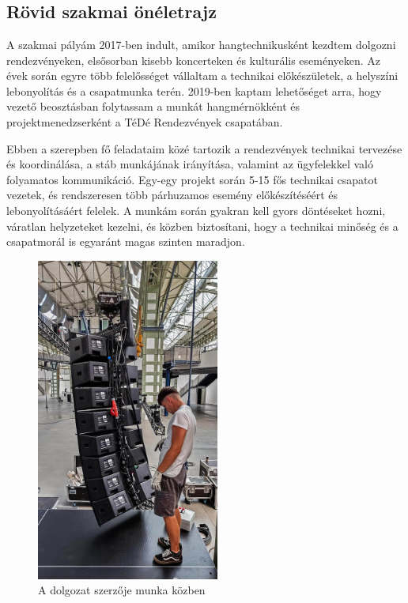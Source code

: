 \chapter{\ManagementExperience}
\section{Rövid szakmai önéletrajz}

A szakmai pályám 2017-ben indult, amikor hangtechnikusként kezdtem dolgozni rendezvényeken, 
elsősorban kisebb koncerteken és kulturális eseményeken. Az évek során egyre több felelősséget vállaltam 
a technikai előkészületek, a helyszíni lebonyolítás és a csapatmunka terén. 2019-ben kaptam lehetőséget arra, 
hogy vezető beosztásban folytassam a munkát hangmérnökként és projektmenedzserként a TéDé Rendezvények csapatában.

Ebben a szerepben fő feladataim közé tartozik a rendezvények technikai tervezése és koordinálása, 
a stáb munkájának irányítása, valamint az ügyfelekkel való folyamatos kommunikáció. 
Egy-egy projekt során 5-15 fős technikai csapatot vezetek, és rendszeresen több párhuzamos esemény 
előkészítéséért és lebonyolításáért felelek. A munkám során gyakran kell gyors döntéseket hozni, 
váratlan helyzeteket kezelni, és közben biztosítani, hogy a technikai minőség és a csapatmorál is 
egyaránt magas szinten maradjon.

\begin{figure}[H]
	\centering
	\includegraphics[width=60mm, keepaspectratio]{figures/danci_wpc.jpg}
	\caption{A dolgozat szerzője munka közben}
	\label {fig:danci_wpc}
\end{figure}

